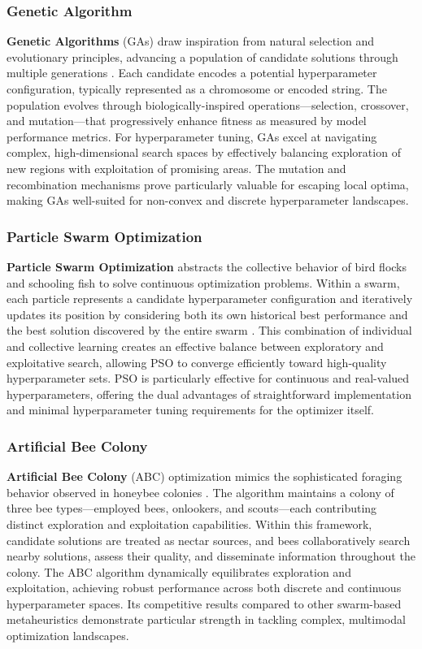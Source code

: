 \documentclass[12pt]{article}
\begin{document}
\subsubsection{Genetic Algorithm}
\textbf{Genetic Algorithms} (GAs) draw inspiration from natural selection and evolutionary principles, advancing a population of candidate solutions through multiple generations \cite{gaopt}. Each candidate encodes a potential hyperparameter configuration, typically represented as a chromosome or encoded string. The population evolves through biologically-inspired operations—selection, crossover, and mutation—that progressively enhance fitness as measured by model performance metrics. For hyperparameter tuning, GAs excel at navigating complex, high-dimensional search spaces by effectively balancing exploration of new regions with exploitation of promising areas. The mutation and recombination mechanisms prove particularly valuable for escaping local optima, making GAs well-suited for non-convex and discrete hyperparameter landscapes.
\subsubsection{Particle Swarm Optimization}
\textbf{Particle Swarm Optimization} abstracts the collective behavior of bird flocks and schooling fish to solve continuous optimization problems. Within a swarm, each particle represents a candidate hyperparameter configuration and iteratively updates its position by considering both its own historical best performance and the best solution discovered by the entire swarm \cite{psoopt}. This combination of individual and collective learning creates an effective balance between exploratory and exploitative search, allowing PSO to converge efficiently toward high-quality hyperparameter sets. PSO is particularly effective for continuous and real-valued hyperparameters, offering the dual advantages of straightforward implementation and minimal hyperparameter tuning requirements for the optimizer itself.
\subsubsection{Artificial Bee Colony}
\textbf{Artificial Bee Colony} (ABC) optimization mimics the sophisticated foraging behavior observed in honeybee colonies \cite{abcopt}. The algorithm maintains a colony of three bee types—employed bees, onlookers, and scouts—each contributing distinct exploration and exploitation capabilities. Within this framework, candidate solutions are treated as nectar sources, and bees collaboratively search nearby solutions, assess their quality, and disseminate information throughout the colony. The ABC algorithm dynamically equilibrates exploration and exploitation, achieving robust performance across both discrete and continuous hyperparameter spaces. Its competitive results compared to other swarm-based metaheuristics demonstrate particular strength in tackling complex, multimodal optimization landscapes.
\end{document}
